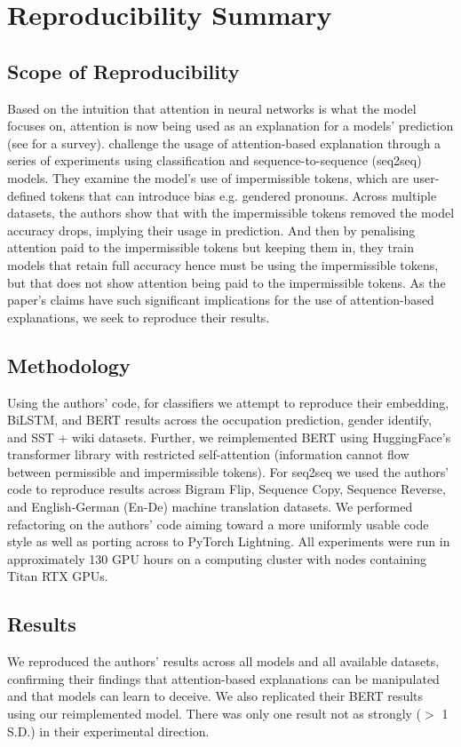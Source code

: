 \section*{\centering Reproducibility Summary}

\subsection*{Scope of Reproducibility}
Based on the intuition that attention in neural networks is what the model focuses on, attention is now being used as an explanation for a models' prediction (see \citet{galassi2020attention} for a survey). \citet{pruthi-etal-2020-learning} challenge the usage of attention-based explanation through a series of experiments using classification and sequence-to-sequence (seq2seq) models. They examine the model's use of impermissible tokens, which are user-defined tokens that can introduce bias e.g. gendered pronouns. Across multiple datasets, the authors show that with the impermissible tokens removed the model accuracy drops, implying their usage in prediction. And then by penalising attention paid to the impermissible tokens but keeping them in, they train models that retain full accuracy hence must be using the impermissible tokens, but that does not show attention being paid to the impermissible tokens. As the paper's claims have such significant implications for the use of attention-based explanations, we seek to reproduce their results.

\subsection*{Methodology}
Using the authors' code, for classifiers we attempt to reproduce their embedding, BiLSTM, and BERT results across the occupation prediction, gender identify, and SST + wiki datasets. Further, we reimplemented BERT using HuggingFace's transformer library \citep{huggingface} with restricted self-attention (information cannot flow between permissible and impermissible tokens). For seq2seq we used the authors' code to reproduce results across Bigram Flip, Sequence Copy, Sequence Reverse, and English-German (En-De) machine translation datasets. We performed refactoring on the authors' code aiming toward a more uniformly usable code style as well as porting across to PyTorch Lightning. All experiments were run in approximately 130 GPU hours on a computing cluster with nodes containing Titan RTX GPUs.

\subsection*{Results}
We reproduced the authors' results across all models and all available datasets, confirming their findings that attention-based explanations can be manipulated and that models can learn to deceive. We also replicated their BERT results using our reimplemented model. There was only one result not as strongly ($>$ 1 S.D.) in their experimental direction.

